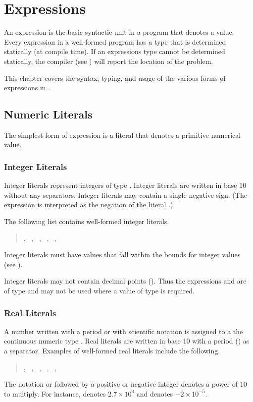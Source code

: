 \chapter{Expressions}

\noindent 
An expression is the basic syntactic unit in a \Stan program that
denotes a value.  Every expression in a well-formed \Stan program has
a type that is determined statically (at compile time).  If an
expressions type cannot be determined statically, the \Stan compiler
(see ) will report the location of the problem.

This chapter covers the syntax, typing, and usage of the various forms
of expressions in \Stan. 

\section{Numeric Literals}

The simplest form of expression is a literal that denotes a primitive
numerical value.   

\subsection{Integer Literals}

Integer literals represent integers of type .  Integer
literals are written in base 10 without any separators.  Integer
literals may contain a single negative sign.  (The expression
 is interpreted as the negation of the literal .)

The following list contains well-formed integer literals.
%
\begin{quote}
, \ , \ , \ , 
\ , \ 
\end{quote}
%
Integer literals must have values that fall within the bounds for
integer values (see ).

Integer literals may not contain decimal points ().  Thus the
expressions  and  are of type  and may
not be used where a value of type  is required.

\subsection{Real Literals}

A number written with a period or with scientific notation is assigned
to a the continuous numeric type .  Real literals are
written in base 10 with a period () as a separator.  Examples
of well-formed real literals include the following.
%
\begin{quote}
, \ , \ , \ , \ 
, \ 
\end{quote}
%
The notation  or  followed by a positive or negative
integer denotes a power of 10 to multiply.  For instance, 
denotes $2.7 \times 10^3$ and \code{-2E-5} denotes $-2 \times
10^{-5}$.


